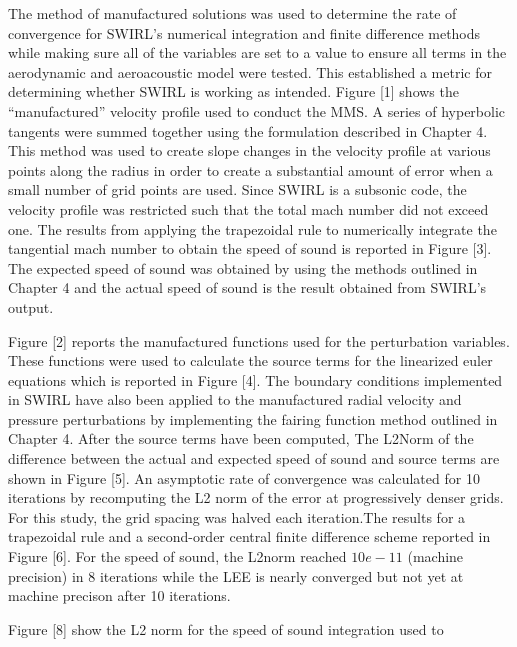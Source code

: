 \documentclass[12pt]{uthesis-v12}  %
\begin{document}
    The method of manufactured solutions was used to determine the rate of convergence 
    for SWIRL's numerical integration and finite difference methods while 
    making sure all of the variables are set to a value to ensure all terms in 
    the aerodynamic and aeroacoustic model were tested. This established a 
    metric for determining whether SWIRL is working as intended. Figure [1] 
    shows the ``manufactured'' velocity profile used to conduct the MMS. A series of 
    hyperbolic tangents were summed together using the formulation described in 
    Chapter 4. This method was used to create slope changes in the velocity profile
    at various points along the radius in order to create a substantial amount of
    error when a small number of grid points are used. Since SWIRL is a subsonic
    code, the velocity profile was restricted such that the total mach number 
    did not exceed one. The results from applying the trapezoidal rule to 
    numerically integrate the tangential mach number to obtain the speed of sound
    is reported in Figure [3]. The expected speed of sound was obtained by using 
    the methods outlined in Chapter 4 and the actual speed of sound is the result 
    obtained from SWIRL's output.

    Figure [2] reports the manufactured functions used for the
    perturbation variables. These functions were used to calculate the source terms
    for the linearized euler equations which is reported in Figure [4]. The boundary
    conditions implemented in SWIRL have also been applied to the 
    manufactured radial velocity and pressure perturbations by implementing the 
    fairing function method outlined in Chapter 4. After the source terms have 
    been computed,     The L2Norm of the difference between the actual and expected speed of sound 
    and source terms are shown in Figure [5]. An asymptotic rate of convergence 
    was calculated for 10 iterations by recomputing the L2 norm of the error at 
    progressively denser grids. For this study, the  grid spacing was halved 
    each iteration.The results for a trapezoidal rule and a second-order central
    finite difference scheme reported in Figure [6].  For the speed of sound, the
    L2norm reached $10e-11$ (machine precision) in 8 iterations while the LEE 
    is nearly converged but not yet at machine precison after 10 iterations. 

    Figure [8] show the L2 norm for the speed of sound integration used to


\end{document}
